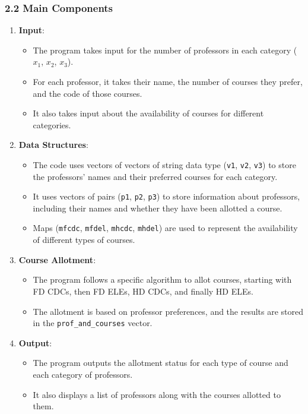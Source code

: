 \documentclass{article}
\begin{document}
\subsubsection*{2.2 Main Components}

\begin{enumerate}
    \item \textbf{Input}:
    \begin{itemize}
        \item The program takes input for the number of professors in each category ($x_1$, $x_2$, $x_3$).
        \item For each professor, it takes their name, the number of courses they prefer, and the code of those courses.
        \item It also takes input about the availability of courses for different categories.
    \end{itemize}
    
    \item \textbf{Data Structures}:
    \begin{itemize}
        \item The code uses vectors of vectors of string data type (\texttt{v1}, \texttt{v2}, \texttt{v3}) to store the professors' names and their preferred courses for each category.
        \item It uses vectors of pairs (\texttt{p1}, \texttt{p2}, \texttt{p3}) to store information about professors, including their names and whether they have been allotted a course.
        \item Maps (\texttt{mfcdc}, \texttt{mfdel}, \texttt{mhcdc}, \texttt{mhdel}) are used to represent the availability of different types of courses.
    \end{itemize}
    
    \item \textbf{Course Allotment}:
    \begin{itemize}
        \item The program follows a specific algorithm to allot courses, starting with FD CDCs, then FD ELEs, HD CDCs, and finally HD ELEs.
        \item The allotment is based on professor preferences, and the results are stored in the \texttt{prof\_and\_courses} vector.
    \end{itemize}
    
    \item \textbf{Output}:
    \begin{itemize}
        \item The program outputs the allotment status for each type of course and each category of professors.
        \item It also displays a list of professors along with the courses allotted to them.
    \end{itemize}
\end{enumerate}
\end{document}
